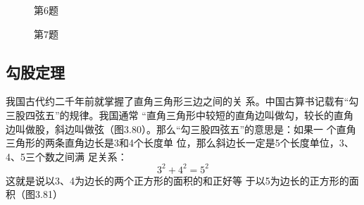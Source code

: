 \begin{figure}
    \begin{minipage}[t]{0.48\linewidth}
    \centering
\begin{tikzpicture}[>=latex, scale=1]
    \end{tikzpicture}
    \caption*{第6题}
    \end{minipage}
    \begin{minipage}[t]{0.48\linewidth}
    \centering
    \begin{tikzpicture}[>=latex, scale=1]
    \end{tikzpicture}
    \caption*{第7题}
    \end{minipage}
    \end{figure}




\subsection{勾股定理}

我国古代约二千年前就掌握了直角三角形三边之间的关
系。中国古算书记载有“勾三股四弦五”的规律。我国通常
“直角三角形中较短的直角边叫做勾，较长的直角边叫做股，斜边叫做弦（图3.80）。那么“勾三股四弦五”的意思是：如果一
个直角三角形的两条直角边长是3和4个长度单
位，那么斜边长一定是5个长度单位，3、4、5三个数之间满
足关系：
\[3^2+4^2=5^2\]
这就是说以3、4为边长的两个正方形的面积的和正好等
于以5为边长的正方形的面积（图3.81）

